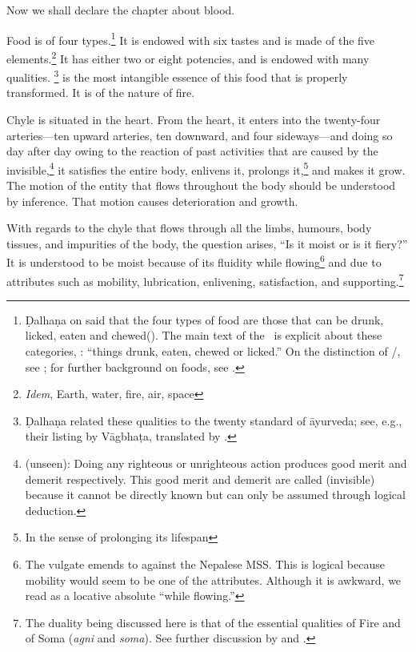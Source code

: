 \begin{translation}    
\item [1] Now we shall declare the chapter about blood.

\item [2]

    
\item [3] Food is of four types.\footnote{Ḍalhaṇa on  said
    that the four types of food are those that can be drunk, licked, eaten and chewed(). The main text of
    the \CS\ is explicit about these categories, :
     “things drunk, eaten, chewed or licked.” On
    the distinction of /, see \cite{yagi-1994}; for
    further background on foods, see \cite{oliv-2001}.} It is endowed with
    six tastes and is made of the five elements.\footnote{\emph{Idem}, Earth,
        water, fire, air, space} It has either two or eight potencies, and is
        endowed with many qualities. \footnote{Ḍalhaṇa related these qualities to
            the twenty standard  of āyurveda; see, e.g., their listing by
            Vāgbhaṭa, translated by \citet[207]{wuja-2003}.}  is
            the most intangible essence of this food that is properly transformed. It
            is of the nature of fire.
                
Chyle is situated in the heart. From the heart, it enters into the
twenty-four arteries—ten upward arteries, ten downward, and four
sideways—and doing so day after day owing to the reaction of past
activities that are caused by the invisible,\footnote{
    (unseen): Doing any righteous or unrighteous action produces good merit
    and demerit respectively. This good merit and demerit are called
     (invisible) because it cannot be directly known but can only
    be assumed through logical deduction.} it satisfies the entire body,
    enlivens it, prolongs it,\footnote{In the sense of prolonging its
        lifespan} and makes it grow. The motion of the entity that flows
        throughout the body should be understood by inference. That motion causes
        deterioration and growth.
    
With regards to the chyle that flows through all the limbs, humours, body tissues, 
and impurities of the body, the question arises, “Is it moist or is it fiery?” It is 
understood to be moist because of its fluidity while flowing\footnote{The vulgate 
emends  to  against the Nepalese MSS. This is 
logical because mobility would seem to be one of the attributes.  Although it is 
awkward, we read  as a locative absolute ``while flowing.''} and 
due to attributes such as mobility, lubrication, enlivening, satisfaction, and 
supporting.\footnote{The duality being discussed here is that of the essential 
qualities of Fire and of Soma (\emph{agni} and \emph{soma}). See further 
discussion by \citet{wuja-2004} and \citet{ange-2021}.}
    

\end{translation}
